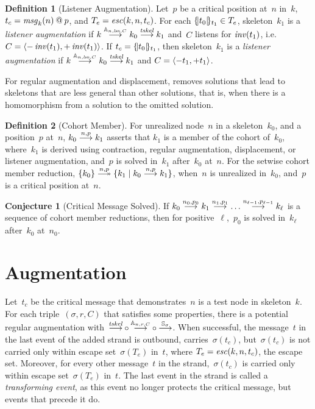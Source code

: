 \documentclass[12pt]{report}
\theoremstyle{definition}
\newtheorem{defn}{Definition}[chapter]
\newtheorem{conj}[thm]{Conjecture}
\newcommand{\msg}{\fn{msg}}
\newcommand{\lsn}{\fn{lsn}}
\begin{document}
\begin{defn}[Listener Augmentation]\label{def:listener augmentation}
Let~$p$ be a critical position at~$n$ in~$k$, $t_c=\msg_k(n)\termat
p$, and $T_e= \operatorname{\mathit{esc}}(k,n,t_c)$.  For each $\{\!|t_0|\!\}_{t_1}\in T_e$,
skeleton~$k_1$ is a \emph{listener
  augmentation} if
$k\reduction{\ops{A}_{n,\lsn,C}}k_0\reduction{\fn{tskel}}k_1$ and~$C$
listens for $\operatorname{\mathit{inv}}(t_1)$,
i.e.\ $C=\langle\mathord -\operatorname{\mathit{inv}}(t_1),\mathord +\operatorname{\mathit{inv}}(t_1)\rangle$.  If
$t_c=\{\!|t_0|\!\}_{t_1}$, then skeleton~$k_1$ is a \emph{listener
  augmentation} if
$k\reduction{\ops{A}_{n,\lsn,C}}k_0\reduction{\fn{tskel}}k_1$ and
$C=\langle\mathord - t_1,\mathord + t_1\rangle$.
\end{defn}

For regular augmentation and displacement, {\cpsa} removes solutions
that lead to skeletons that are less general than other solutions,
that is, when there is a homomorphism from a solution to the omitted
solution.

\begin{defn}[Cohort Member]\label{def:cohort member}
For unrealized node~$n$ in a skeleton~$k_0$, and a position~$p$
at~$n$, $k_0\stackrel{n,p}{\longrightarrow}k_1$ asserts that $k_1$ is a member of the
cohort of~$k_0$, where~$k_1$ is derived using
contraction, regular augmentation, displacement, or listener
augmentation, and~$p$ is solved in~$k_1$ after~$k_0$ at~$n$.  For the
setwise cohort member reduction, $\{k_0\}\setreduction{n,p}\{k_1\mid
k_0\reduction{n,p}k_1\}$, when~$n$ is unrealized in~$k_0$, and~$p$ is
a critical position at~$n$.
\end{defn}

\begin{conj}[Critical Message Solved]
If $k_0\stackrel{n_0,p_0}{\longrightarrow}k_1 \stackrel{n_1,p_1}{\longrightarrow}\ldots
\stackrel{n_{\ell-1},p_{\ell-1}}{\longrightarrow}k_\ell$ is a sequence of cohort member
reductions, then for positive~$\ell$,~$p_0$ is solved in~$k_\ell$
after~$k_0$ at~$n_0$.
\end{conj}

\section{Augmentation}\label{sec:augmentation}

Let~$t_c$ be the critical message that demonstrates~$n$ is a test node
in skeleton~$k$.  For each triple~$(\sigma,r,C)$ that satisfies some
properties, there is a potential regular augmentation
with~$\comp{\reduction{\fn{tskel}}}%
{\comp{\reduction{\ops{A}_{n,r,C}}}{\reduction{\ops{S}_\sigma}}}$.
When successful, the message~$t$ in the last event of the added strand
is outbound, carries~$\sigma(t_c)$, but~$\sigma(t_c)$ is not carried
only within escape set~$\sigma(T_e)$ in~$t$, where
$T_e=\operatorname{\mathit{esc}}(k,n,t_c)$, the escape set.  Moreover, for every other
message~$t$ in the strand,~$\sigma(t_c)$ is carried only within escape
set~$\sigma(T_e)$ in~$t$.  The last event in the strand is called a
\emph{transforming event}, as this event no
longer protects the critical message, but events that precede it do.
\end{document}
